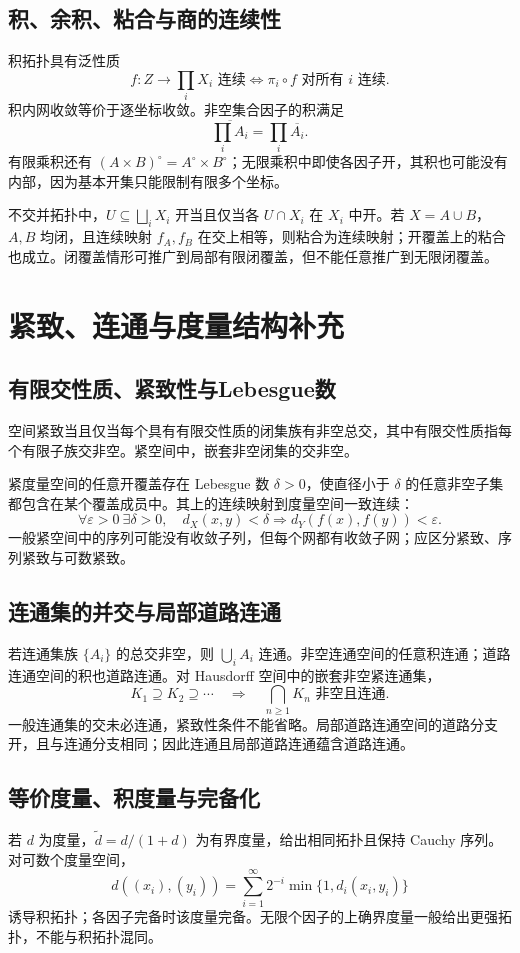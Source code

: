 \documentclass[../main.tex]{subfiles}
\begin{document}
\subsection{积、余积、粘合与商的连续性}
积拓扑具有泛性质
\[
f:Z\to\prod_iX_i\text{ 连续}\iff\pi_i\circ f\text{ 对所有 }i\text{ 连续}.
\]
积内网收敛等价于逐坐标收敛。非空集合因子的积满足
\[
\overline{\prod_iA_i}=\prod_i\overline{A_i}.
\]
有限乘积还有 $(A\times B)^\circ=A^\circ\times B^\circ$；无限乘积中即使各因子开，其积也可能没有内部，因为基本开集只能限制有限多个坐标。

不交并拓扑中，$U\subseteq\bigsqcup_iX_i$ 开当且仅当各 $U\cap X_i$ 在 $X_i$ 中开。若 $X=A\cup B$，$A,B$ 均闭，且连续映射 $f_A,f_B$ 在交上相等，则粘合为连续映射；开覆盖上的粘合也成立。闭覆盖情形可推广到局部有限闭覆盖，但不能任意推广到无限闭覆盖。

\section{紧致、连通与度量结构补充}
\subsection{有限交性质、紧致性与Lebesgue数}
空间紧致当且仅当每个具有有限交性质的闭集族有非空总交，其中有限交性质指每个有限子族交非空。紧空间中，嵌套非空闭集的交非空。

紧度量空间的任意开覆盖存在 Lebesgue 数 $\delta>0$，使直径小于 $\delta$ 的任意非空子集都包含在某个覆盖成员中。其上的连续映射到度量空间一致连续：
\[
\forall\varepsilon>0\ \exists\delta>0,\quad
d_X(x,y)<\delta\Longrightarrow d_Y(f(x),f(y))<\varepsilon.
\]
一般紧空间中的序列可能没有收敛子列，但每个网都有收敛子网；应区分紧致、序列紧致与可数紧致。

\subsection{连通集的并交与局部道路连通}
若连通集族 $\{A_i\}$ 的总交非空，则 $\bigcup_iA_i$ 连通。非空连通空间的任意积连通；道路连通空间的积也道路连通。对 Hausdorff 空间中的嵌套非空紧连通集，
\[
K_1\supseteq K_2\supseteq\cdots\quad\Longrightarrow\quad
\bigcap_{n\ge1}K_n\text{ 非空且连通}.
\]
一般连通集的交未必连通，紧致性条件不能省略。局部道路连通空间的道路分支开，且与连通分支相同；因此连通且局部道路连通蕴含道路连通。

\subsection{等价度量、积度量与完备化}
若 $d$ 为度量，$\widetilde d=d/(1+d)$ 为有界度量，给出相同拓扑且保持 Cauchy 序列。对可数个度量空间，
\[
d((x_i),(y_i))=\sum_{i=1}^\infty2^{-i}\min\{1,d_i(x_i,y_i)\}
\]
诱导积拓扑；各因子完备时该度量完备。无限个因子的上确界度量一般给出更强拓扑，不能与积拓扑混同。
\end{document}
